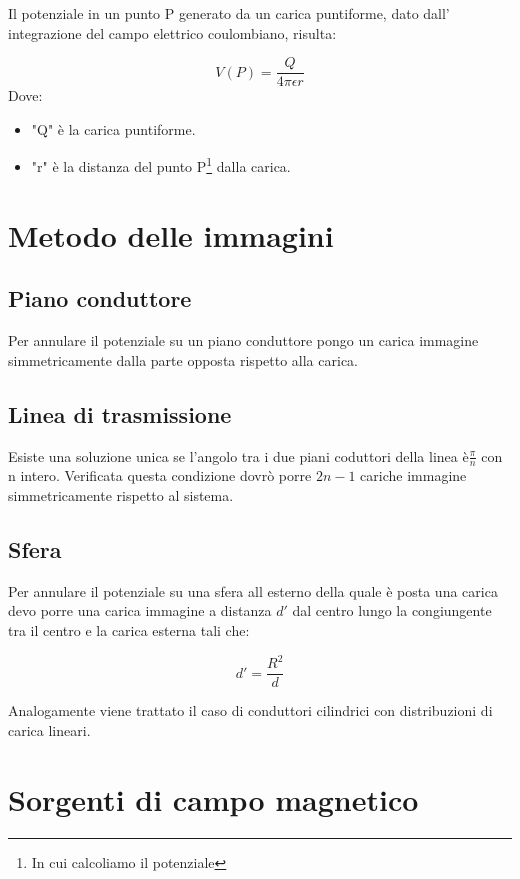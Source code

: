 \documentclass[10pt,a4paper]{report}
\begin{document}
		Il potenziale in un punto P generato da un carica puntiforme, dato dall' integrazione del campo elettrico coulombiano, risulta:

		\[
		V(P)=\frac{Q}{4\pi \epsilon r}
		\]
		Dove:
		\begin{itemize}
		\item "Q" è la carica puntiforme.

		\item "r" è la distanza del punto P\footnote{In cui calcoliamo il potenziale} dalla carica.
		\end{itemize}

\chapter{Metodo delle immagini}	


	\section{Piano conduttore}

	Per annulare il potenziale su un piano conduttore pongo un carica immagine simmetricamente dalla parte opposta rispetto alla carica.

	\section{Linea di trasmissione}

	Esiste una soluzione unica se l'angolo tra i due piani coduttori della linea è$\frac{\pi}{n}$ con n intero.
	Verificata questa condizione dovrò porre $2n-1$ cariche immagine simmetricamente rispetto al sistema.

	\section{Sfera}

	Per annulare il potenziale su una sfera all esterno della quale è posta una carica devo porre una carica immagine a distanza $d'$ dal centro lungo la congiungente tra il centro e la carica esterna tali che:

	\[
	d'=\frac{R^2}{d}
	\]

	Analogamente viene trattato il caso di conduttori cilindrici con distribuzioni di carica lineari.

\chapter{Sorgenti di campo magnetico}
\end{document}
